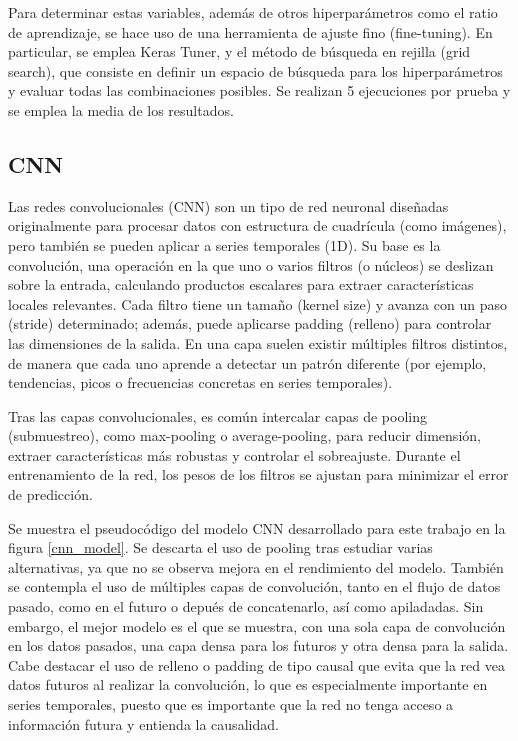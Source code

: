 Para determinar estas variables, además de otros hiperparámetros como el ratio de aprendizaje, se hace uso de una herramienta de ajuste fino (fine-tuning). En particular, se emplea Keras Tuner, y el método de búsqueda
en rejilla (grid search), que consiste en definir un espacio de búsqueda para los hiperparámetros y evaluar todas las combinaciones posibles. Se realizan 5 ejecuciones por prueba y se 
emplea la media de los resultados.

\subsection{CNN}
Las redes convolucionales (CNN) son un tipo de red neuronal diseñadas originalmente para procesar datos con estructura de cuadrícula (como imágenes), pero también se pueden aplicar a series temporales (1D).
Su base es la convolución, una operación en la que uno o varios filtros (o núcleos) se deslizan sobre la entrada, calculando productos escalares para extraer características locales relevantes.
Cada filtro tiene un tamaño (kernel size) y avanza con un paso (stride) determinado; además, puede aplicarse padding (relleno) para controlar las dimensiones de la salida.
En una capa suelen existir múltiples filtros distintos, de manera que cada uno aprende a detectar un patrón diferente (por ejemplo, tendencias, picos o frecuencias concretas en series temporales).

Tras las capas convolucionales, es común intercalar capas de pooling (submuestreo), como max-pooling o average-pooling, para reducir dimensión, extraer características más robustas y controlar el sobreajuste.
Durante el entrenamiento de la red, los pesos de los filtros se ajustan para minimizar el error de predicción.

Se muestra el pseudocódigo del modelo CNN desarrollado para este trabajo en la figura \ref{cnn_model}. Se descarta el uso de pooling tras estudiar varias alternativas, ya que no se observa mejora en 
el rendimiento del modelo. También se contempla el uso de múltiples capas de convolución, tanto en el flujo de datos pasado, como en el futuro o depués de concatenarlo, así como apiladadas. 
Sin embargo, el mejor modelo es el que se muestra, con una sola capa de convolución en los datos pasados, una capa densa para los futuros y otra densa para la salida.
Cabe destacar el uso de relleno o padding de tipo causal que evita que la red vea datos futuros al realizar la convolución, lo que es especialmente importante en series temporales, puesto que es 
importante que la red no tenga acceso a información futura y entienda la causalidad.


